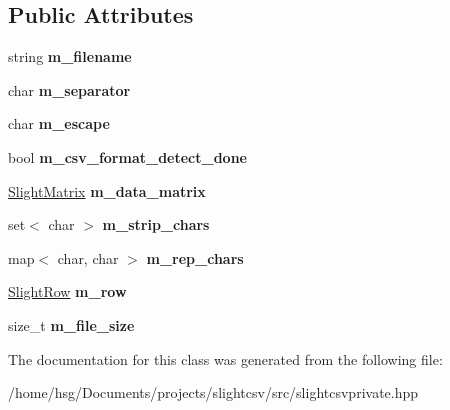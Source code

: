 \subsection*{Public Attributes}
\begin{DoxyCompactItemize}
\item 
\mbox{\label{classutils_1_1SlightCSVPrivate_a1ca95cf105a198d5198d201d6b5593fe}} 
string {\bfseries m\+\_\+filename}
\item 
\mbox{\label{classutils_1_1SlightCSVPrivate_a836ab9f1c58bf3efdb984f030035fbb4}} 
char {\bfseries m\+\_\+separator}
\item 
\mbox{\label{classutils_1_1SlightCSVPrivate_a51b4fad3286a164618d7390a727998a1}} 
char {\bfseries m\+\_\+escape}
\item 
\mbox{\label{classutils_1_1SlightCSVPrivate_acb8d8f3bcb5d902799d05583cf01c9c0}} 
bool {\bfseries m\+\_\+csv\+\_\+format\+\_\+detect\+\_\+done}
\item 
\mbox{\label{classutils_1_1SlightCSVPrivate_a493870cd6f6add7bd4488d10dd97f2dc}} 
\hyperlink{classutils_1_1SlightMatrix}{Slight\+Matrix} {\bfseries m\+\_\+data\+\_\+matrix}
\item 
\mbox{\label{classutils_1_1SlightCSVPrivate_a6f50ac7d188e7de0abb9bfbc5b541840}} 
set$<$ char $>$ {\bfseries m\+\_\+strip\+\_\+chars}
\item 
\mbox{\label{classutils_1_1SlightCSVPrivate_a7ccffa0f8479297780dc49316f3d447a}} 
map$<$ char, char $>$ {\bfseries m\+\_\+rep\+\_\+chars}
\item 
\mbox{\label{classutils_1_1SlightCSVPrivate_aa1734b01fd9826c41aaefa5df7367468}} 
\hyperlink{classutils_1_1SlightRow}{Slight\+Row} {\bfseries m\+\_\+row}
\item 
\mbox{\label{classutils_1_1SlightCSVPrivate_ab452b617c295b5cdbf5500fca94f622d}} 
size\+\_\+t {\bfseries m\+\_\+file\+\_\+size}
\end{DoxyCompactItemize}


The documentation for this class was generated from the following file\+:\begin{DoxyCompactItemize}
\item 
/home/hsg/\+Documents/projects/slightcsv/src/slightcsvprivate.\+hpp\end{DoxyCompactItemize}

